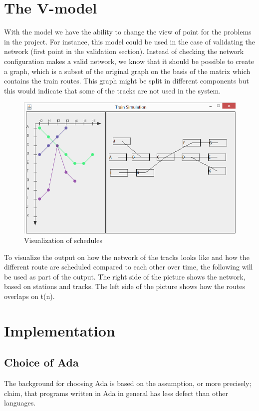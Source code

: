 \documentclass[10pt,a4paper]{article}
\begin{document}
\section{The V-model}
 
With the model we have the ability to change the view of point for the problems in the project.
For instance, this model could be used in the case of validating the network (first point in the validation section). Instead of checking the network configuration makes a valid network, we know that it should be possible to create a graph, which is a subset of the original graph on the basis of the matrix which contains the train routes. This graph might be split in different components but this would indicate that some of the tracks are not used in the system.
\begin{figure}[h]
\centering
\includegraphics[scale=0.6]{fig/graphical_schedule.png}
 \caption{Visualization of schedules}
 \label{fig:graphical_schedule}
\end{figure}

To visualize the output on how the network of the tracks looks like and how the different route are scheduled compared to each other over time, the following will be used as part of the output. 
The right side of the picture shows the network, based on stations and tracks. The left side of the picture shows how the routes overlaps on t(n).


\section{Implementation}

\subsection{Choice of Ada}
The background for choosing Ada is based on the assumption, or more precisely; claim, that programs written in Ada in general has less defect than other languages.\\
\end{document}
